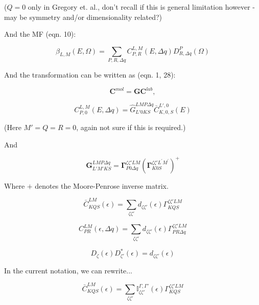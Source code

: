 ($Q=0$ only in Gregory et. al., don't recall if this is general limitation
however - may be symmetry and/or dimensionality related?)

And the MF (eqn. 10):

\begin{equation}
\beta_{L,M}(E,\Omega)=\sum_{P,R,\Delta q}C_{P,R}^{L,M}(E,\Delta q)D_{R,\Delta q}^{P}(\Omega)
\end{equation}

And the transformation can be written as (eqn. 1, 28):

\begin{equation}
\mathbf{C}^{mol}=\mathbf{G}\mathbf{C}^{lab},\label{eq:basic}
\end{equation}

\begin{equation}
C_{P,0}^{L,M}(E,\Delta q)=\hat{G}_{L'0KS}^{LMP\Delta q}\bar{C}_{K,0,S}^{L',0}(E)
\end{equation}

(Here $M'=Q=R=0$, again not sure if this is required.)

And

\begin{equation}
\mathbf{G}_{L'M'KS}^{LMP\Delta q}=\mathbf{\Gamma}_{P0\Delta q}^{\zeta\zeta'LM}(\mathbf{\Gamma}_{K0S}^{\zeta\zeta'L^{\prime}M^{\prime}})^{+}
\end{equation}

Where $+$ denotes the Moore-Penrose inverse matrix.

\begin{equation}
\bar{C}_{KQS}^{LM}(\epsilon)=\sum_{\zeta\zeta'}d_{\zeta\zeta'}(\epsilon)\Gamma_{KQS}^{\zeta\zeta'LM}
\end{equation}

\begin{equation}
C_{PR}^{LM}(\epsilon,\Delta q)=\sum_{\zeta\zeta'}d_{\zeta\zeta'}(\epsilon)\Gamma_{PR\Delta q}^{\zeta\zeta'LM}
\end{equation}

\begin{equation}
D_{\zeta}(\epsilon)D_{\zeta'}^{*}(\epsilon)=d_{\zeta\zeta'}(\epsilon)
\end{equation}

In the current notation, we can rewrite...

\begin{equation}
\bar{C}_{KQS}^{LM}(\epsilon)=\sum_{\zeta\zeta'}\mathbb{I}_{\zeta\zeta'}^{\Gamma,\Gamma'}(\epsilon)\Gamma_{KQS}^{\zeta\zeta'LM}
\end{equation}

